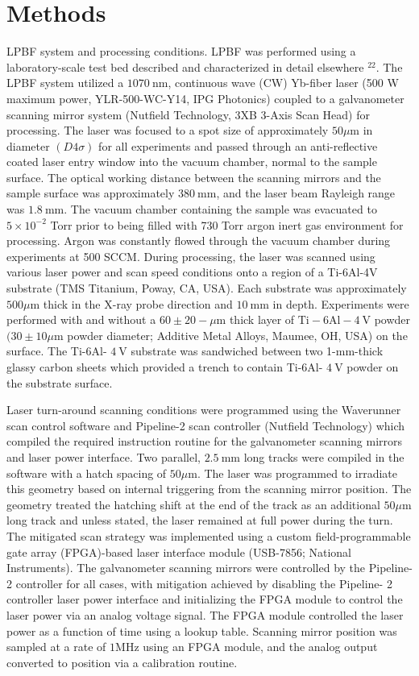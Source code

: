 \documentclass[10pt]{article}
\begin{document}
\section*{Methods}
LPBF system and processing conditions. LPBF was performed using a laboratory-scale test bed described and characterized in detail elsewhere ${ }^{22}$. The LPBF system utilized a $1070 \mathrm{~nm}$, continuous wave (CW) Yb-fiber laser (500 W maximum power, YLR-500-WC-Y14, IPG Photonics) coupled to a galvanometer scanning mirror system (Nutfield Technology, 3XB 3-Axis Scan Head) for processing. The laser was focused to a spot size of approximately $50 \mu \mathrm{m}$ in diameter $(D 4 \sigma)$ for all experiments and passed through an anti-reflective coated laser entry window into the vacuum chamber, normal to the sample surface. The optical working distance between the scanning mirrors and the sample surface was approximately $380 \mathrm{~mm}$, and the laser beam Rayleigh range was $1.8 \mathrm{~mm}$. The vacuum chamber containing the sample was evacuated to $5 \times 10^{-2}$ Torr prior to being filled with 730 Torr argon inert gas environment for processing. Argon was constantly flowed through the vacuum chamber during experiments at 500 SCCM. During processing, the laser was scanned using various laser power and scan speed conditions onto a region of a Ti-6Al-4V substrate (TMS Titanium, Poway, CA, USA). Each substrate was approximately $500 \mu \mathrm{m}$ thick in the X-ray probe direction and $10 \mathrm{~mm}$ in depth. Experiments were performed with and without a $60 \pm 20-\mu \mathrm{m}$ thick layer of $\mathrm{Ti}-6 \mathrm{Al}-4 \mathrm{~V}$ powder $(30 \pm 10 \mu \mathrm{m}$ powder diameter; Additive Metal Alloys, Maumee, OH, USA) on the surface. The Ti-6Al- $4 \mathrm{~V}$ substrate was sandwiched between two 1-mm-thick glassy carbon sheets which provided a trench to contain Ti-6Al- $4 \mathrm{~V}$ powder on the substrate surface.

Laser turn-around scanning conditions were programmed using the Waverunner scan control software and Pipeline-2 scan controller (Nutfield Technology) which compiled the required instruction routine for the galvanometer scanning mirrors and laser power interface. Two parallel, $2.5 \mathrm{~mm}$ long tracks were compiled in the software with a hatch spacing of $50 \mu \mathrm{m}$. The laser was programmed to irradiate this geometry based on internal triggering from the scanning mirror position. The geometry treated the hatching shift at the end of the track as an additional $50 \mu \mathrm{m}$ long track and unless stated, the laser remained at full power during the turn. The mitigated scan strategy was implemented using a custom field-programmable gate array (FPGA)-based laser interface module (USB-7856; National Instruments). The galvanometer scanning mirrors were controlled by the Pipeline- 2 controller for all cases, with mitigation achieved by disabling the Pipeline- 2 controller laser power interface and initializing the FPGA module to control the laser power via an analog voltage signal. The FPGA module controlled the laser power as a function of time using a lookup table. Scanning mirror position was sampled at a rate of $1 \mathrm{MHz}$ using an FPGA module, and the analog output converted to position via a calibration routine.
\end{document}
